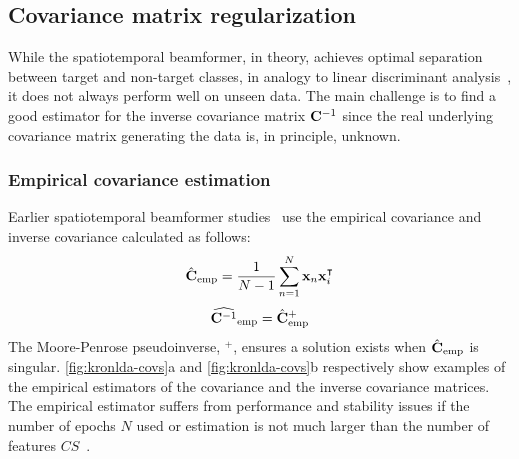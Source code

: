 	\subsection{Covariance matrix regularization}
	While the spatiotemporal beamformer, in theory, achieves optimal separation
	between target and non-target classes, in analogy to linear discriminant
  analysis~\cite{Treder2016}, it does not always perform well on unseen data.
	The main challenge is to find a good estimator for the inverse covariance
  matrix $\mathbf{C}^{-1}$ since the real underlying covariance matrix generating the data is, in principle, unknown.

	\subsubsection{Empirical covariance estimation}
	\label{sec:stbf-struct/methods/emp-cov}
	Earlier spatiotemporal beamformer studies~\cite{Wittevrongel2016,
		Wittevrongel2016a, Wittevrongel2017, Wittevrongel2017a} use the empirical
	covariance and inverse covariance calculated as follows:
	\begin{equation}
    \hat{\mathbf{C}}_\text{emp} =
		\frac{1}{N-1}\sum^{N}_{n=1}\mathbf{x}_n\mathbf{x}_i^\intercal
		\label{eq:stbf-struct/emp-cov}
	\end{equation}
	\begin{equation}
    \widehat{\mathbf{C}^{-1}}_\text{emp} = \hat{\mathbf{C}}_\text{emp}^+
		\label{eq:stbf-struct/emp-inv-cov}
	\end{equation}
	The Moore-Penrose pseudoinverse, $^+$, ensures a solution exists when
  $\hat{\mathbf{C}}_\text{emp}$ is singular.
	\cref{fig:kronlda-covs}a and \cref{fig:kronlda-covs}b respectively show examples of the
	empirical estimators of the covariance and the inverse covariance matrices.
	The empirical estimator suffers from performance and
	stability issues if the number of epochs $N$ used or estimation is not much larger than the number of features $CS$~\cite{Stein1956,Khatri1987}.

